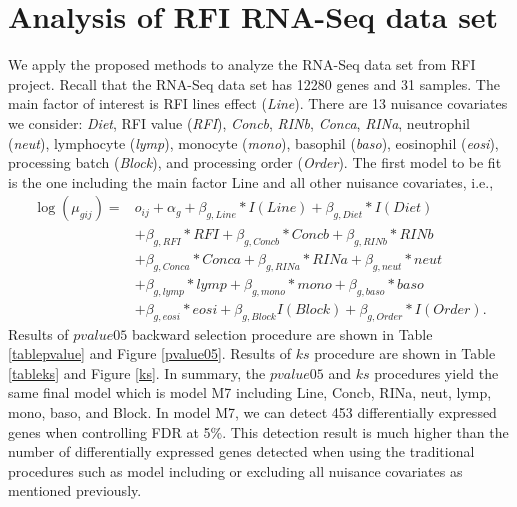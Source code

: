 \documentclass[12pt, letter]{article}\usepackage[]{graphicx}\usepackage[]{color}
\begin{document}
\section{ Analysis of RFI RNA-Seq data set}
We apply the proposed methods to analyze the RNA-Seq data set from RFI project. Recall that the RNA-Seq data set has 12280 genes and 31 samples. The main factor of interest is RFI lines effect (\emph{Line}). There are 13 nuisance covariates we consider: \emph{Diet}, RFI value (\emph{RFI}), \emph{Concb}, \emph{RINb}, \emph{Conca}, \emph{RINa}, neutrophil (\emph{neut}), lymphocyte (\emph{lymp}), monocyte (\emph{mono}), basophil (\emph{baso}), eosinophil (\emph{eosi}), processing batch (\emph{Block}), and processing order (\emph{Order}). The first model to be fit is the one including the main factor Line and all other nuisance covariates, i.e., 
\begin{align*}
\log(\mu_{gij}) = & o_{ij} +\alpha_g + \beta_{g,Line}*I(Line) + \beta_{g,Diet}*I(Diet)\\
     & + \beta_{g,RFI}*RFI + \beta_{g,Concb}*Concb + \beta_{g,RINb}*RINb \\
     & + \beta_{g,Conca}*Conca + \beta_{g,RINa}*RINa + \beta_{g,neut}*neut \\
     & + \beta_{g,lymp}*lymp + \beta_{g,mono}*mono + \beta_{g,baso}*baso\\
     & + \beta_{g,eosi}*eosi + \beta_{g,Block}I(Block) + \beta_{g,Order}*I(Order).
\end{align*}
Results of $pvalue05$ backward selection procedure are shown in Table \ref{tablepvalue} and Figure \ref{pvalue05}.  Results of $ks$ procedure are shown in  Table \ref{tableks} and Figure \ref{ks}. In summary, the $pvalue05$ and $ks$ procedures yield the same final model which is model M7 including Line, Concb, RINa, neut, lymp, mono, baso, and Block. In model M7, we can detect 453 differentially expressed genes when controlling FDR at 5\%.  This detection result is much higher than the number of differentially expressed genes detected when using the traditional procedures such as model including or excluding all nuisance covariates as mentioned previously. 
\end{document}
